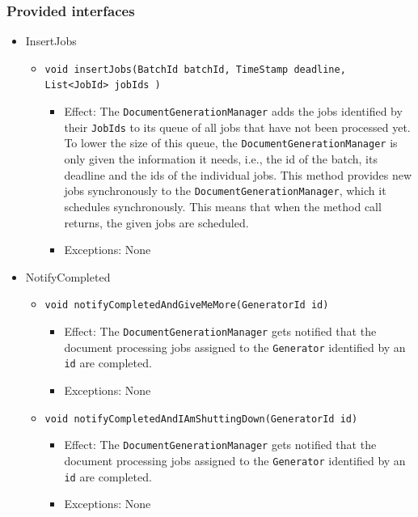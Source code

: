 \documentclass[a4paper,10pt]{article}
\begin{document}
\subsubsection*{Provided interfaces}
\begin{itemize}
    \item InsertJobs
    \begin{itemize}
        \item \texttt{void insertJobs(BatchId batchId, TimeStamp deadline, List<JobId> jobIds )}
        \begin{itemize}
            \item Effect: The \texttt{DocumentGenerationManager} adds the jobs identified by their \texttt{JobIds} to its queue of all jobs that have not been processed yet. To lower the size of this queue, the \texttt{DocumentGenerationManager} is only given the information it needs, i.e., the id of the batch, its deadline and the ids of the individual jobs. This method provides new jobs synchronously to the \texttt{\texttt{DocumentGenerationManager}}, which it schedules synchronously. This means that when the method call returns, the given jobs are scheduled.
            \item Exceptions: None
        \end{itemize}
    \end{itemize}

    \item NotifyCompleted
    \begin{itemize}
        \item \texttt{void notifyCompletedAndGiveMeMore(GeneratorId id)}
        \begin{itemize}
            \item Effect: The \texttt{DocumentGenerationManager} gets notified that the document processing jobs assigned to the \texttt{Generator} identified by an \texttt{id} are completed. 
            \item Exceptions: None
        \end{itemize}
        
        \item \texttt{void notifyCompletedAndIAmShuttingDown(GeneratorId id)}
        \begin{itemize}
            \item Effect: The \texttt{DocumentGenerationManager} gets notified that the document processing jobs assigned to the \texttt{Generator} identified by an \texttt{id} are completed. 
            \item Exceptions: None
        \end{itemize}
    \end{itemize}
\end{itemize}
\end{document}
